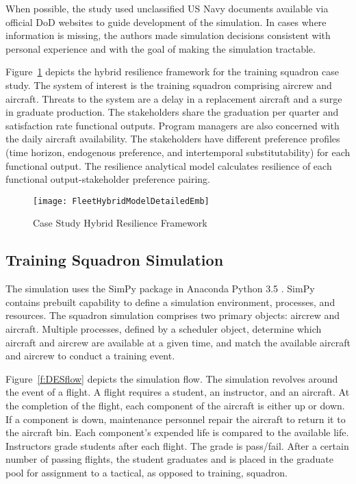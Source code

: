 When possible, the study used unclassified US Navy documents
available via official DoD websites to guide development of the
simulation. In cases where information is missing, the authors made
simulation decisions consistent with personal experience and with the
goal of making the simulation tractable.

Figure~\ref{f:FleetFramework} depicts the hybrid resilience framework
for the training squadron case study. The system of interest is the
training squadron comprising aircrew and aircraft. Threats to the
system are a delay in a replacement aircraft and a surge in graduate
production. The stakeholders share the graduation per quarter and
satisfaction rate functional outputs. Program managers are also
concerned with the daily aircraft availability. The stakeholders have
different preference profiles (time horizon, endogenous preference,
and intertemporal substitutability) for each functional output. The
resilience analytical model calculates resilience of each functional
output-stakeholder preference pairing.

\begin{figure}[h]
  \centering\texttt{[image: FleetHybridModelDetailedEmb]}
  \caption{Case Study Hybrid Resilience Framework}
  \label{f:FleetFramework}
\end{figure}


\subsection{Training Squadron Simulation}

The simulation uses the SimPy \cite{Scherfke2018} package in Anaconda
Python 3.5 \cite{Anaconda2016}. SimPy contains 
prebuilt capability to define a simulation environment, processes, and
resources. The squadron simulation comprises two primary objects: aircrew and
aircraft. Multiple processes, defined by a scheduler object, determine
which aircraft and aircrew are available at a given time, and match
the available aircraft and aircrew to conduct a training event.

Figure~\ref{f:DESflow} depicts the simulation flow. The simulation
revolves around the event of a flight.  A flight requires a student,
an instructor, and an aircraft. At the completion of the flight, each
component of the aircraft is either up or down. If a component is
down, maintenance personnel repair the aircraft to return it to the
aircraft bin. Each component's expended life is compared to the
available life. Instructors grade students after each flight. The
grade is pass/fail. After a certain number of passing flights, the
student graduates and is placed in the graduate pool for assignment to
a tactical, as opposed to training, squadron.

